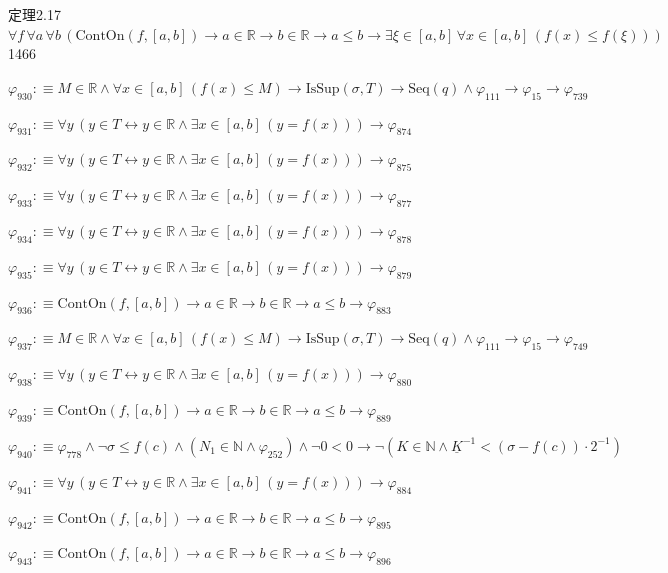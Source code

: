 \begin{fullproof}{定理2.17}{$\forall f\,\forall a\,\forall b\,(\mathrm{ContOn}(f,[a,b]) \to a \in \mathbb{R} \to b \in \mathbb{R} \to a \leq b \to \exists \xi \in [a,b]\,\forall x \in [a,b]\,(f(x) \leq f(\xi)))$}{1466}
\begin{abbrevlist}
\item $\varphi_{930} :\equiv M \in \mathbb{R} \land \forall x \in [a,b]\,(f(x) \leq M) \to \mathrm{IsSup}(\sigma,T) \to \mathrm{Seq}(q) \land \varphi_{111} \to \varphi_{15} \to \varphi_{739}$
\item $\varphi_{931} :\equiv \forall y\,(y \in T \leftrightarrow y \in \mathbb{R} \land \exists x \in [a,b]\,(y = f(x))) \to \varphi_{874}$
\item $\varphi_{932} :\equiv \forall y\,(y \in T \leftrightarrow y \in \mathbb{R} \land \exists x \in [a,b]\,(y = f(x))) \to \varphi_{875}$
\item $\varphi_{933} :\equiv \forall y\,(y \in T \leftrightarrow y \in \mathbb{R} \land \exists x \in [a,b]\,(y = f(x))) \to \varphi_{877}$
\item $\varphi_{934} :\equiv \forall y\,(y \in T \leftrightarrow y \in \mathbb{R} \land \exists x \in [a,b]\,(y = f(x))) \to \varphi_{878}$
\item $\varphi_{935} :\equiv \forall y\,(y \in T \leftrightarrow y \in \mathbb{R} \land \exists x \in [a,b]\,(y = f(x))) \to \varphi_{879}$
\item $\varphi_{936} :\equiv \mathrm{ContOn}(f,[a,b]) \to a \in \mathbb{R} \to b \in \mathbb{R} \to a \leq b \to \varphi_{883}$
\item $\varphi_{937} :\equiv M \in \mathbb{R} \land \forall x \in [a,b]\,(f(x) \leq M) \to \mathrm{IsSup}(\sigma,T) \to \mathrm{Seq}(q) \land \varphi_{111} \to \varphi_{15} \to \varphi_{749}$
\item $\varphi_{938} :\equiv \forall y\,(y \in T \leftrightarrow y \in \mathbb{R} \land \exists x \in [a,b]\,(y = f(x))) \to \varphi_{880}$
\item $\varphi_{939} :\equiv \mathrm{ContOn}(f,[a,b]) \to a \in \mathbb{R} \to b \in \mathbb{R} \to a \leq b \to \varphi_{889}$
\item $\varphi_{940} :\equiv \varphi_{778} \land \neg \sigma \leq f(c) \land (N_{1} \in \mathbb{N} \land \varphi_{252}) \land \neg 0 < 0 \to \neg (K \in \mathbb{N} \land \underline{K}^{-1} < (\sigma - f(c)) \cdot 2^{-1})$
\item $\varphi_{941} :\equiv \forall y\,(y \in T \leftrightarrow y \in \mathbb{R} \land \exists x \in [a,b]\,(y = f(x))) \to \varphi_{884}$
\item $\varphi_{942} :\equiv \mathrm{ContOn}(f,[a,b]) \to a \in \mathbb{R} \to b \in \mathbb{R} \to a \leq b \to \varphi_{895}$
\item $\varphi_{943} :\equiv \mathrm{ContOn}(f,[a,b]) \to a \in \mathbb{R} \to b \in \mathbb{R} \to a \leq b \to \varphi_{896}$

\end{abbrevlist}
\end{fullproof}
